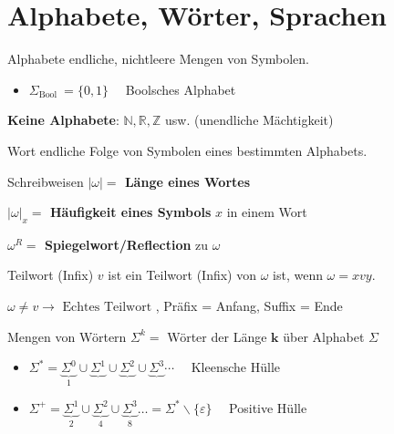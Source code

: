 \section*{Alphabete, Wörter, Sprachen}

\begin{definition}{Alphabete} endliche, nichtleere Mengen von Symbolen.
\begin{itemize}
  \item $\Sigma_{\text {Bool }}=\{0,1\} \quad$ Boolsches Alphabet
\end{itemize}
\textbf{Keine Alphabete}: $\mathbb{N}, \mathbb{R}, \mathbb{Z}$ usw. (unendliche Mächtigkeit)
\end{definition}

\begin{definition}{Wort}
    endliche Folge von Symbolen eines bestimmten Alphabets.
\end{definition}

\begin{definition}{Schreibweisen}
    \textbf{$|\omega|=$ Länge eines Wortes}

    \textbf{$|\omega|_{x}=$ Häufigkeit eines Symbols} $x$ in einem Wort

    \textbf{$\omega^{R}=$ Spiegelwort/Reflection} zu $\omega$
\end{definition}

\begin{definition}{Teilwort (Infix)}
    $v$ ist ein Teilwort (Infix) von $\omega$ ist, wenn $\omega=x v y$.

    $\omega \neq v \rightarrow \text { Echtes Teilwort }$, Präfix = Anfang, Suffix = Ende
\end{definition}

\begin{definition}{Mengen von Wörtern}
    $\Sigma^{k}=$ Wörter der Länge $\boldsymbol{k}$ über Alphabet $\Sigma$
    \begin{itemize}
        \item $\Sigma^{*}=\underbrace{\Sigma^{0}}_{1} \cup \underbrace{\Sigma^{1}} \cup \underbrace{\Sigma^{2}} \cup \underbrace{\Sigma^{3}} \cdots \quad$ Kleensche Hülle
        \item $\Sigma^{+}=\underbrace{\Sigma^{1}}_{2} \cup \underbrace{\Sigma^{2}}_{4} \cup \underbrace{\Sigma^{3}}_{8} \ldots=\Sigma^{*} \backslash\{\varepsilon\} \quad$ Positive Hülle
      \end{itemize}
\end{definition}


